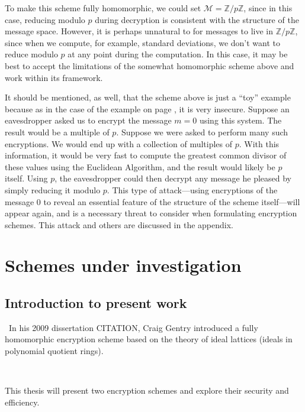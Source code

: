 \documentclass[11pt]{report}
\newcommand{\M}{\mathcal{M}}
\newcommand{\Zp}{\mathbb{Z}/p\mathbb{Z}}
\begin{document}
To make this scheme fully homomorphic, we could set $\M = \Zp$, since in this case, reducing modulo $p$ during decryption is consistent with the structure of the message space. However, it is perhaps unnatural to for messages to live in $\Zp$, since when we compute, for example, standard deviations, we don't want to reduce modulo $p$ at any point during the computation. In this case, it may be best to accept the limitations of the somewhat homomorphic scheme above and work within its framework.

It should be mentioned, as well, that the scheme above is just a ``toy'' example because as in the case of the example on page \pageref{Example1}, it is very insecure. Suppose an eavesdropper asked us to encrypt the message $m=0$ using this system. The result would be a multiple of $p$. Suppose we were asked to perform many such encryptions. We would end up with a collection of multiples of $p$. With this information, it would be very fast to compute the greatest common divisor of these values using the Euclidean Algorithm, and the result would likely be $p$ itself. Using $p$, the eavesdropper could then decrypt any message he pleased by simply reducing it modulo $p$. This type of attack---using encryptions of the message $0$ to reveal an essential feature of the structure of the scheme itself---will appear again, and is a necessary threat to consider when formulating encryption schemes. This attack and others are discussed in the appendix.

\chapter{Schemes under investigation}

\section{Introduction to present work}

\
In his 2009 dissertation CITATION, Craig Gentry introduced a fully homomorphic encryption scheme based on the theory of ideal lattices (ideals in polynomial quotient rings). 

\

This thesis will present two encryption schemes and explore their security and efficiency.
\end{document}
